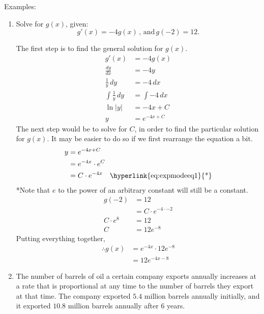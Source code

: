 \documentclass[12pt]{article}
\begin{document}
\noindent Examples:
\begin{enumerate}
    \item Solve for $g(x)$, given:
          \[ g'(x) = -4 g(x) \, \text{, and} \, g(-2) = 12. \]

          The first step is to find the general solution for $g(x)$.
          \begin{align*}
              g'(x)                  & = -4 g(x)       \\
              \frac{dy}{dx}          & = -4y           \\[6pt]
              \frac{1}{y} \, dy      & = -4 \, dx      \\[6pt]
              \int \frac{1}{y} \, dy & = \int -4 \, dx \\[6pt]
              \ln|y|                 & = -4x + C       \\
              y                      & = e^{-4x + C}
          \end{align*}
          The next step would be to solve for $C$, in order to find the particular solution for $g(x)$. It may be easier to do so if we first rearrange the equation a bit.
          \begin{align*}
              y & = e^{-4x + C}                                               \\
                & = e^{-4x} \cdot e^C                                         \\
                & = C \cdot e^{-4x} \quad \text{\hyperlink{eq:expmodeeq1}{*}}
          \end{align*}
          \hypertarget{eq:expmodeq1}{*}Note that $e$ to the power of an arbitrary constant will still be a constant.
          \begin{align*}
              g(-2)       & = 12                      \\
                          & = C \cdot e^{-4 \cdot -2} \\
              C \cdot e^8 & = 12                      \\
              C           & = 12 e^{-8}
          \end{align*}
          Putting everything together,
          \begin{align*}
              \therefore g(x) & = e^{-4x} \cdot 12 e^{-8} \\
                              & = 12 e^{-4x-8}
          \end{align*}
          \smallskip

    \item The number of barrels of oil a certain company exports annually increases at a rate that is proportional at any time to the number of barrels they export at that time. The company exported $5.4$ million barrels annually initially, and it exported $10.8$ million barrels annually after $6$ years.


\end{enumerate}
\end{document}
